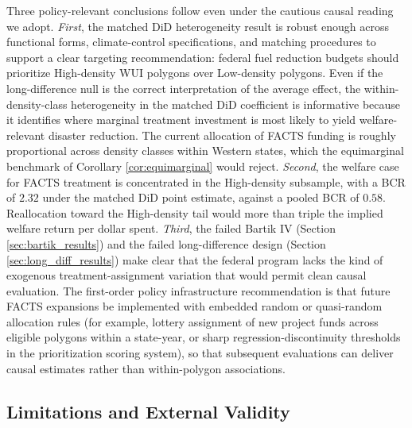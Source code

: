 \documentclass[12pt, letterpaper]{article}
\begin{document}
Three policy-relevant conclusions follow even under the cautious causal reading we adopt. \textit{First}, the matched DiD heterogeneity result is robust enough across functional forms, climate-control specifications, and matching procedures to support a clear targeting recommendation: federal fuel reduction budgets should prioritize High-density WUI polygons over Low-density polygons. Even if the long-difference null is the correct interpretation of the average effect, the within-density-class heterogeneity in the matched DiD coefficient is informative because it identifies where marginal treatment investment is most likely to yield welfare-relevant disaster reduction. The current allocation of FACTS funding is roughly proportional across density classes within Western states, which the equimarginal benchmark of Corollary \ref{cor:equimarginal} would reject. \textit{Second}, the welfare case for FACTS treatment is concentrated in the High-density subsample, with a BCR of $2.32$ under the matched DiD point estimate, against a pooled BCR of $0.58$. Reallocation toward the High-density tail would more than triple the implied welfare return per dollar spent. \textit{Third}, the failed Bartik IV (Section \ref{sec:bartik_results}) and the failed long-difference design (Section \ref{sec:long_diff_results}) make clear that the federal program lacks the kind of exogenous treatment-assignment variation that would permit clean causal evaluation. The first-order policy infrastructure recommendation is that future FACTS expansions be implemented with embedded random or quasi-random allocation rules (for example, lottery assignment of new project funds across eligible polygons within a state-year, or sharp regression-discontinuity thresholds in the prioritization scoring system), so that subsequent evaluations can deliver causal estimates rather than within-polygon associations.

\subsection{Limitations and External Validity}
\end{document}
